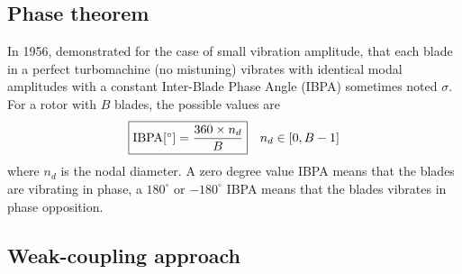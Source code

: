 \subsection{Phase theorem}
\label{sub:lane_theorem}

In 1956, \citet{Lane1956} 
demonstrated for the case of small vibration amplitude,
that each blade in a perfect turbomachine (no mistuning) vibrates with
identical modal amplitudes with a constant Inter-Blade
Phase Angle (IBPA) sometimes noted $\sigma$. For a rotor with $B$ blades,
the possible values are
\begin{equation}
    \fbox{$\textrm{IBPA} [^\circ] = \displaystyle \frac{360 \times n_d}{B}$} \quad n_d \in [0, B-1]
\end{equation}
where $n_d$ is the nodal diameter.
A zero degree value IBPA means that the blades are vibrating in phase, a $180^\circ$ or
$-180^\circ$ IBPA means that the blades vibrates in phase opposition.

\subsection{Weak-coupling approach}
\label{sub:weak_coupling_approach}

